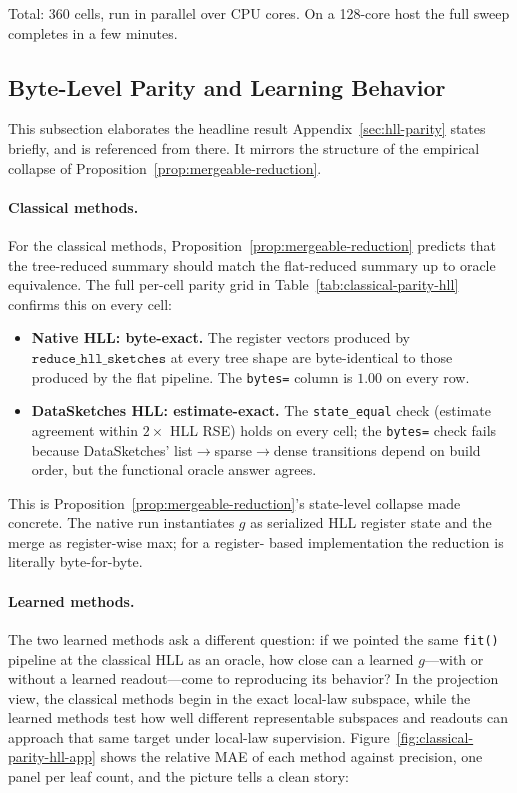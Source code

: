 Total: $360$ cells, run in parallel over CPU cores. On a 128-core host
the full sweep completes in a few minutes.

\subsection{Byte-Level Parity and Learning Behavior}\label{app:hll-empirical-collapse}

This subsection elaborates the headline result Appendix~\ref{sec:hll-parity}
states briefly, and is referenced from there. It mirrors the structure
of the empirical collapse of Proposition~\ref{prop:mergeable-reduction}.

\paragraph{Classical methods.}
For the classical methods, Proposition~\ref{prop:mergeable-reduction}
predicts that the tree-reduced summary should match the flat-reduced
summary up to oracle equivalence. The full per-cell parity grid in
Table~\ref{tab:classical-parity-hll} confirms this on every cell:

\begin{itemize}[leftmargin=1.5em]
    \item \textbf{Native HLL: byte-exact.} The register vectors
          produced by $\texttt{reduce\_hll\_sketches}$ at every tree
          shape are byte-identical to those produced by the flat
          pipeline. The \texttt{bytes=} column is $1.00$ on every row.
    \item \textbf{DataSketches HLL: estimate-exact.} The
          \texttt{state\_equal} check (estimate agreement within
          $2\times$ HLL RSE) holds on every cell; the \texttt{bytes=}
          check fails because DataSketches' list$\to$sparse$\to$dense
          transitions depend on build order, but the functional
          oracle answer agrees.
\end{itemize}

This is Proposition~\ref{prop:mergeable-reduction}'s state-level
collapse made concrete. The native run instantiates $g$ as serialized
HLL register state and the merge as register-wise max; for a register-
based implementation the reduction is literally byte-for-byte.

{\small

}

\paragraph{Learned methods.}
The two learned methods ask a different question: if we pointed the
same \texttt{fit()} pipeline at the classical HLL as an oracle, how
close can a learned $g$---with or without a learned readout---come to
reproducing its behavior? In the projection view, the classical
methods begin in the exact local-law subspace, while the learned
methods test how well different representable subspaces and readouts
can approach that same target under local-law supervision.
Figure~\ref{fig:classical-parity-hll-app} shows the relative MAE of each
method against precision, one panel per leaf count, and the picture
tells a clean story:

